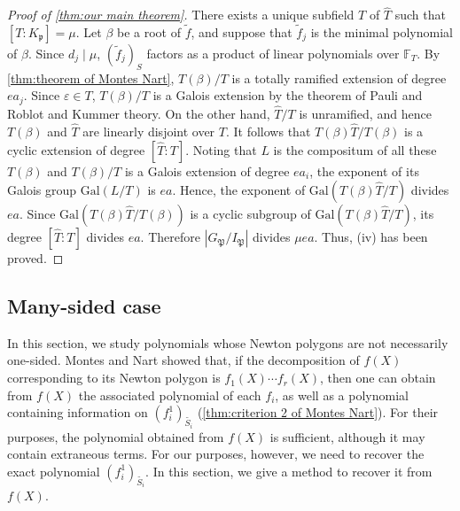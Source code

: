\documentclass{article}
\newcommand{\field}[1]{\mathbb{#1}}
\newcommand{\Gal}{\mathrm{Gal}}
\theoremstyle{definition}
\theoremstyle{remark}
\numberwithin{equation}{section}
\begin{document}
\begin{proof}[Proof of \cref{thm:our main theorem}]
  There exists a unique subfield $T$ of $\hat{T}$ such that $[T:K_{\mathfrak{p}}] = \mu$. 
  Let $\beta$ be a root of $\tilde{f}$, and suppose that $\tilde{f}_j$ is the minimal polynomial of $\beta$. 
  Since $d_j \mid \mu$, $(\tilde{f}_j)_S$ factors as a product of linear polynomials over $\field{F}_T$. 
  By \cref{thm:theorem of Montes Nart}, $T(\beta)/T$ is a totally ramified extension of degree $ea_j$. 
  Since $\varepsilon \in T$, $T(\beta)/T$ is a Galois extension by the theorem of Pauli and Roblot and Kummer theory. 
  On the other hand, $\hat{T}/T$ is unramified, and hence $T(\beta)$ and $\hat{T}$ are linearly disjoint over $T$. 
  It follows that $T(\beta)\hat{T}/T(\beta)$ is a cyclic extension of degree $[\hat{T}:T]$. 
  Noting that $L$ is the compositum of all these $T(\beta)$ and $T(\beta)/T$ is a Galois extension of degree $ea_i$, 
  the exponent of its Galois group $\Gal(L/T)$ is $ea$. 
  Hence, the exponent of $\Gal(T(\beta)\hat{T}/T)$ divides $ea$. 
  Since $\Gal(T(\beta)\hat{T}/T(\beta))$ is a cyclic subgroup of $\Gal(T(\beta)\hat{T}/T)$, 
  its degree $[\hat{T}:T]$ divides $ea$. Therefore $|G_{\mathfrak{P}}/I_{\mathfrak{P}}|$ divides $\mu ea$. 
  Thus, (iv) has been proved. 

  \end{proof}

  \subsection{Many-sided case}\label{sec:many-sided}

  In this section, we study polynomials whose Newton polygons are not necessarily one-sided.
  Montes and Nart showed that,
  if the decomposition of $f(X)$ corresponding to its Newton polygon is $f_{1}(X)\cdots f_{r}(X)$,
  then one can obtain from $f(X)$ the associated polynomial of each $f_{i}$, as well as a polynomial containing information on $(f_{i}^{1})_{\widetilde{S_{i}}}$ (\cref{thm:criterion 2 of Montes Nart}).
  For their purposes, the polynomial obtained from $f(X)$ is sufficient, although it may contain extraneous terms. 
  For our purposes, however, we need to recover the exact polynomial $(f_i^1)_{\widetilde{S_{i}}}$. 
  In this section, we give a method to recover it from $f(X)$. 
\end{document}
